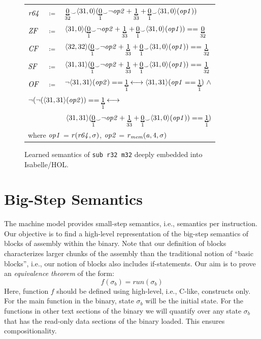 \begin{figure}[htb]
\begin{tabular}{lcl}
$\mathit{r64}$ & $\coloneqq$ & $\bitmoded{32}{0} {_\smile} \langle 31,0\rangle(\bitmoded{1}{0} {_\smile} \neg \var{op2} + \bitmoded{33}{1} + \bitmoded{1}{0} {_\smile} \langle 31,0\rangle(\var{op1}))$\\
$\mathit{ZF}$ & $\coloneqq$ & $\langle 31,0\rangle(\bitmoded{1}{0} {_\smile} \neg \var{op2} + \bitmoded{33}{1} + \bitmoded{1}{0} {_\smile} \langle 31,0\rangle(\var{op1})) == \bitmoded{32}{0}$\\
$\mathit{CF}$ & $\coloneqq$ & $\langle 32,32\rangle(\bitmoded{1}{0} {_\smile} \neg \var{op2} + \bitmoded{33}{1} + \bitmoded{1}{0} {_\smile} \langle 31,0\rangle(\var{op1})) == \bitmoded{32}{1}$\\
$\mathit{SF}$ & $\coloneqq$ & $\langle 31,31\rangle(\bitmoded{1}{0} {_\smile} \neg \var{op2} + \bitmoded{33}{1} + \bitmoded{1}{0} {_\smile} \langle 31,0\rangle(\var{op1})) == \bitmoded{32}{1}$\\
$\mathit{OF}$ & $\coloneqq$ & $\neg \langle 31,31\rangle(\var{op2}) == \bitmoded{1}{1} \longleftrightarrow \langle 31,31\rangle(\var{op1} == \bitmoded{1}{1})~\wedge$ \\
\multicolumn{3}{l}{ $\neg(\neg(\langle 31,31\rangle(\var{op2})) == \bitmoded{1}{1} \longleftrightarrow$}\\
\multicolumn{3}{r}{$\langle 31,31\rangle(\bitmoded{1}{0} {_\smile}\neg \var{op2} + \bitmoded{33}{1} + \bitmoded{1}{0} {_\smile}\langle 31,0\rangle(\var{op1})) == \bitmoded{1}{1})$}\\
\multicolumn{3}{l}{\hspace{3ex}where $\mathit{op1}$  =  $r(\mathit{r64}, \sigma)$,   
$\mathit{op2}$  =  $r_{\mathit{mem}}(\mathit{a},4,\sigma)$}

\end{tabular}
\caption{Learned semantics of \texttt{sub~r32~m32} deeply embedded into Isabelle/HOL.}
\label{fig:learned_semantics_sub}
\end{figure}

\section{Big-Step Semantics}\label{sec:block_semantics}

The machine model provides small-step semantics, i.e., semantics per instruction.
Our objective is to find a high-level representation of the big-step semantics of blocks of assembly within the binary.
Note that our definition of blocks characterizes larger chunks of the assembly than the traditional notion of ``basic blocks'', i.e., our notion of blocks also includes if-statements.
Our aim is to prove an \emph{equivalence theorem} of the form:
\[
	f(\sigma_b) = run(\sigma_b)
\]
Here, function $f$ should be defined using high-level, i.e., C-like, constructs only.
For the main function in the binary, state $\sigma_b$ will be the initial state.
For the functions in other text sections of the binary we will quantify over any state $\sigma_b$ that has the read-only data sections of the binary loaded.
This ensures compositionality.

